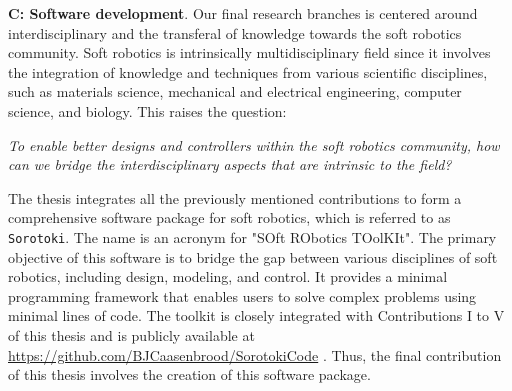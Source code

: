 \textbf{C: Software development}. Our final research branches is centered around interdisciplinary and the transferal of knowledge towards the soft robotics community. Soft robotics is intrinsically multidisciplinary field since it involves the integration of knowledge and techniques from various scientific disciplines, such as materials science, mechanical and electrical engineering, computer science, and biology. This raises the question:

\begin{center}
\textit{To enable better designs and controllers within the soft robotics community, how can we bridge the interdisciplinary aspects that are intrinsic to the field?}
\end{center}
%
The thesis integrates all the previously mentioned contributions to form a comprehensive software package for soft robotics, which is referred to as \texttt{Sorotoki}. The name is an acronym for "SOft RObotics TOolKIt". The primary objective of this software is to bridge the gap between various disciplines of soft robotics, including design, modeling, and control. It provides a minimal programming framework that enables users to solve complex problems using minimal lines of code. The toolkit is closely integrated with Contributions I to V of this thesis and is publicly available at \url{https://github.com/BJCaasenbrood/SorotokiCode} \cite{SorotokiCode}. Thus, the final contribution of this thesis involves the creation of this software package.
%
%
